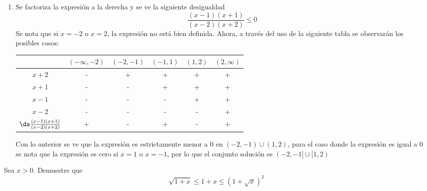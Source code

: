 \documentclass{ayudantia}
\begin{document}
\begin{ans}
    \begin{sol}
        \begin{enumerate}
            \item Se factoriza la expresión a la derecha y se ve la siguiente desigualdad
            \begin{equation*}
                \frac{(x-1)(x+1)}{(x-2)(x+2)}\leq0
            \end{equation*}
            Se nota que si \(x=-2\) o \(x=2\), la expresión no está bien definida. Ahora, a través del uso de la siguiente tabla se observarán los posibles casos:
            \begin{center}
                \begin{tabular}{c|c|c|c|c|c|}
                    &\((-\infty,-2)\)&\((-2,-1)\)&\((-1,1)\)&\((1,2)\)&\((2,\infty)\)\\\hline
                    \(x+2\)&-&+&+&+&+\\
                    \(x+1\)&-&-&+&+&+\\
                    \(x-1\)&-&-&-&+&+\\
                    \(x-2\)&-&-&-&-&+\\
                    \(\ds\frac{(x-1)(x+1)}{(x-2)(x+2)}\)&+&-&+&-&+\\
                \end{tabular}
            \end{center}
            Con lo anterior se ve que la expresión es estrictamente menor a \(0\) en \((-2,-1)\cup(1,2)\), para el caso donde la expresión es igual a \(0\) se nota que la expresión es cero si \(x=1\) o \(x=-1\), por lo que el conjunto solución es \((-2,-1]\cup[1,2)\)
        \end{enumerate}
    \end{sol}
\end{ans}


\begin{prob}
    Sea \(x>0\). Demuestre que
    \begin{equation*}
        \sqrt{1+x}\leq1+x\leq(1+\sqrt{x})^2
    \end{equation*}
\end{prob}
\end{document}
